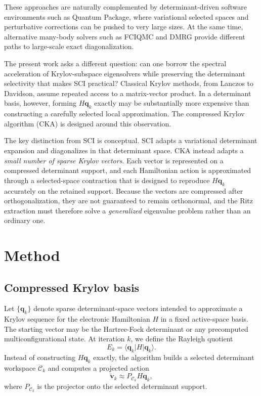 \documentclass[aip,jcp,preprint,longbibliography]{revtex4-2}
\begin{document}
These approaches are naturally complemented by determinant-driven software environments such as Quantum Package,\cite{garniron2019qp2} where variational selected spaces and perturbative corrections can be pushed to very large sizes. At the same time, alternative many-body solvers such as FCIQMC\cite{booth2009fciqmc} and DMRG\cite{white1992dmrg,chan2011dmrgchem} provide different paths to large-scale exact diagonalization.

The present work asks a different question: can one borrow the spectral acceleration of Krylov-subspace eigensolvers while preserving the determinant selectivity that makes SCI practical? Classical Krylov methods, from Lanczos\cite{lanczos1950} to Davidson,\cite{davidson1975} assume repeated access to a matrix-vector product. In a determinant basis, however, forming $H\bm q_k$ exactly may be substantially more expensive than constructing a carefully selected local approximation. The compressed Krylov algorithm (CKA) is designed around this observation.

The key distinction from SCI is conceptual. SCI adapts a variational determinant expansion and diagonalizes in that determinant space. CKA instead adapts a \emph{small number of sparse Krylov vectors}. Each vector is represented on a compressed determinant support, and each Hamiltonian action is approximated through a selected-space contraction that is designed to reproduce $H\bm q_k$ accurately on the retained support. Because the vectors are compressed after orthogonalization, they are not guaranteed to remain orthonormal, and the Ritz extraction must therefore solve a \emph{generalized} eigenvalue problem rather than an ordinary one.

\section{Method}
\subsection{Compressed Krylov basis}
Let $\{\bm q_k\}$ denote sparse determinant-space vectors intended to approximate a Krylov sequence for the electronic Hamiltonian $H$ in a fixed active-space basis. The starting vector may be the Hartree-Fock determinant or any precomputed multiconfigurational state. At iteration $k$, we define the Rayleigh quotient
\begin{equation}
E_k = \langle \bm q_k | H | \bm q_k \rangle.
\end{equation}
Instead of constructing $H\bm q_k$ exactly, the algorithm builds a selected determinant workspace $\mathcal{C}_k$ and computes a projected action
\begin{equation}
\widetilde{\bm v}_k \approx P_{\mathcal{C}_k} H \bm q_k,
\end{equation}
where $P_{\mathcal{C}_k}$ is the projector onto the selected determinant support.
\end{document}
